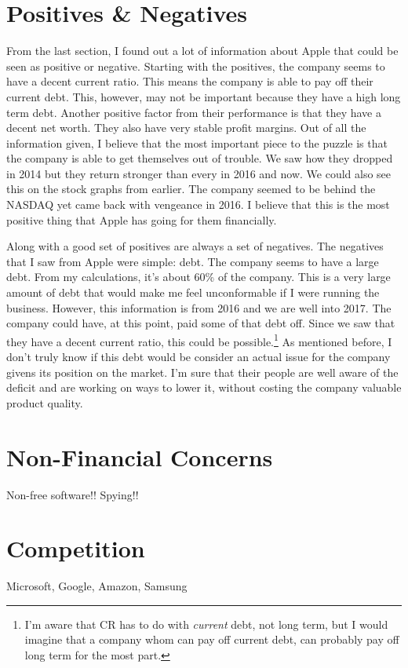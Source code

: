 \documentclass[12pt,a4paper,titlepage]{article}
\begin{document}
\newpage

\section{Positives \& Negatives}
From the last section, I found out a lot of information about Apple that could
be seen as positive or negative. Starting with the positives, the company seems
to have a decent current ratio. This means the company is able to pay off their
current debt. This, however, may not be important because they have a high long
term debt. Another positive factor from their performance is that they have a
decent net worth. They also have very stable profit margins. Out of all the
information given, I believe that the most important piece to the puzzle is that
the company is able to get themselves out of trouble. We saw how they dropped
in 2014 but they return stronger than every in 2016 and now. We could also see
this on the stock graphs from earlier. The company seemed to be behind the
NASDAQ yet came back with vengeance in 2016. I believe that this is the most
positive thing that Apple has going for them financially.

Along with a good set of positives are always a set of negatives. The negatives
that I saw from Apple were simple: debt. The company seems to have a large
debt. From my calculations, it's about 60\% of the company. This is a very large
amount of debt that would make me feel unconformable if I were running the
business. However, this information is from 2016 and we are well into 2017. The
company could have, at this point, paid some of that debt off. Since we saw that
they have a decent current ratio, this could be possible.\footnote{I'm aware
  that CR has to do with \emph{current} debt, not long term, but I would imagine
  that a company whom can pay off current debt, can probably pay off long term
  for the most part.} As mentioned before, I don't truly know if this debt would
be consider an actual issue for the company givens its position on the
market. I'm sure that their people are well aware of the deficit and are working
on ways to lower it, without costing the company valuable product quality.


\section{Non-Financial Concerns}
Non-free software!! Spying!!

\section{Competition}
Microsoft, Google, Amazon, Samsung
\end{document}
